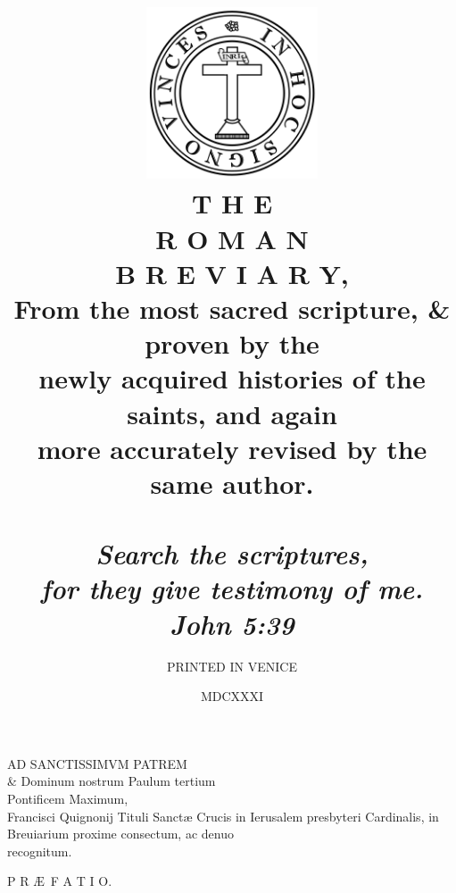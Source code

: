 \documentclass[a5paper,10pt]{book}
\newcommand\myemptypage{
    \null
    \thispagestyle{empty}
    \addtocounter{page}{-1}
    \newpage
    }
\def\AE{Æ}
\begin{document}


\title{\includegraphics[width=2in]{Picture1.png} \\ \LARGE \bfseries \color{Red} T H E \\ \Huge R O M A N \\ \huge B R E V I A R Y, \\ \large \mdseries \color{Black} From the most sacred scripture, \& proven by the \\ newly acquired histories of the saints, and again \\ more accurately revised by the \\ same author. \\ \ \\ \itshape Search the scriptures, \\ for they give testimony of me. \\John 5:39}

\author{PRINTED IN VENICE}
\date{MDCXXXI}

\maketitle

\myemptypage



\begin{center} \color{red}
AD SANCTISSIMVM PATREM \\ \& Dominum nostrum Paulum tertium \\ Pontificem Maximum, \\ \color{black} Francisci Quignonij Tituli Sanctæ Crucis in Ierusalem presbyteri Cardinalis, in Breuiarium proxime consectum, ac denuo \\ recognitum.
\end{center}

\centerline{\color{red}P R \AE \ F A T I O.}
\end{document}
